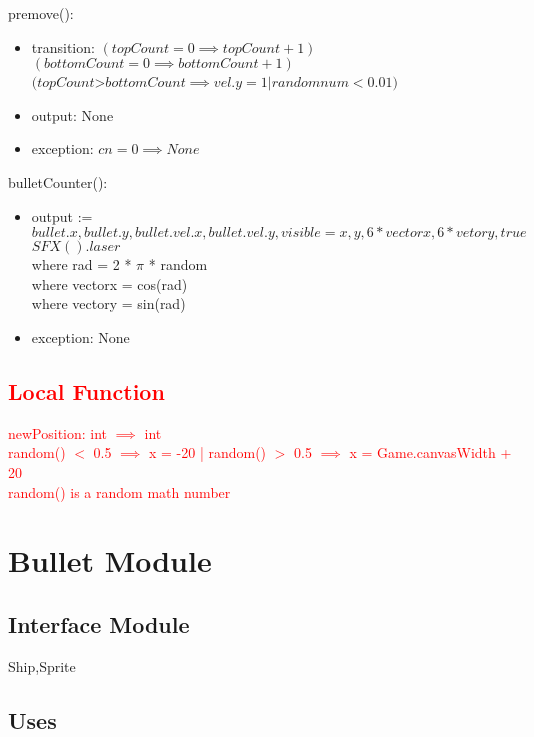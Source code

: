 \documentclass[12pt]{article}
\begin{document}
\noindent premove():
\begin{itemize} 
\item transition: $(topCount = 0 \implies topCount + 1)$\\
$(bottomCount = 0 \implies bottomCount + 1)$\\
$(topCount $>$ bottomCount \implies vel.y = 1 | randomnum < 0.01)$\\
\item output: None
\item exception: $cn = 0 \implies None$
\end{itemize}

\noindent bulletCounter():
\begin{itemize}
\item output := $bullet.x, bullet.y , bullet.vel.x, bullet.vel.y, visible  = x,y,6 * vectorx , 6 * vetory, true$\\
$SFX().laser$\\
where rad = 2 * $\pi$ * random\\
where vectorx = cos(rad)\\
where vectory = sin(rad)\\
\item exception: None
\end{itemize}

\subsection* {\textcolor{red}{Local Function}}

\noindent \textcolor{red}{newPosition: int $\implies$ int}\\
\noindent \textcolor{red}{random() $<$ 0.5 $\implies$ x = -20 | random() $>$ 0.5 $\implies$ x = Game.canvasWidth + 20}\\
\noindent \textcolor{red}{random() is a random math number} \\

\newpage

\section* {Bullet Module}

\subsection*{Interface Module}

Ship,Sprite

\subsection* {Uses}
\end{document}
